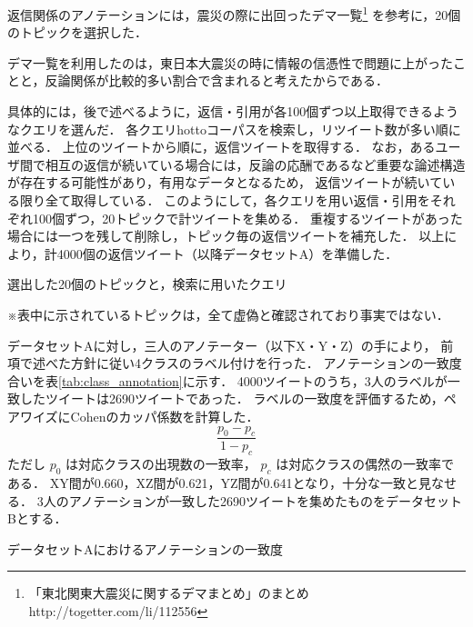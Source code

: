 \documentclass[japanese]{jnlp_1.4}
\newcommand{\addspan}[1]{}
\begin{document}
返信関係のアノテーションには，震災の際に出回ったデマ一覧\footnote{「東北関東大震災に関するデマまとめ」のまとめ http://togetter.com/li/112556}
を参考に，20個のトピックを選択した．
\addspan{トピックは，デマの内容を端的に説明する短い文である．}
デマ一覧を利用したのは，東日本大震災の時に情報の信憑性で問題に上がったことと，反論関係が比較的多い割合で含まれると考えたからである．
\addspan{それぞれのトピックに関連するツイートを収集するために，クエリとしてトピック中の単語を設定する．}
\addspan{選んだトピックとクエリを表\ref{tab:20query}に示す．}
\addspan{これらのトピックは，クエリで検索できるツイートから，十分な数の返信を抽出できるように選択した．}
具体的には，後で述べるように，返信・引用が各100個ずつ以上取得できるような\addspan{トピックと}クエリを選んだ．
各クエリ\addspan{で}hottoコーパスを検索し，リツイート数が多い順に並べる．
上位のツイートから順に，返信ツイートを取得する．
なお，あるユーザ間で相互の返信が続いている場合には，反論の応酬であるなど重要な論述構造が存在する可能性があり，有用なデータとなるため，
返信ツイートが続いている限り全て取得している．
このようにして，各クエリを用い返信・引用をそれぞれ100個ずつ，20トピックで計\addspan{4000}ツイートを集める．
\addspan{この中に}重複するツイートがあった場合には一つを残して削除し，トピック毎の返信ツイートを補充した．
以上により，計4000個の返信ツイート（以降データセットA）を準備した．

\begin{table}[t]
\caption{選出した20個のトピックと，検索に用いたクエリ}
\label{tab:20query}

\vspace{0.5zw}\small
  ※表中に示されているトピックは，全て虚偽と確認されており事実ではない．\par
\end{table}

データセットAに対し，三人のアノテーター（以下X・Y・Z）の手により，
前項で述べた方針に従い4クラスのラベル付けを行った．
アノテーションの一致度合いを表\ref{tab:class_annotation}に示す．
4000ツイートのうち，3人のラベルが一致したツイートは2690ツイートであった．
ラベルの一致度を評価するため，ペアワイズにCohenのカッパ係数を計算した．
\[
\frac{p_0 - p_c}{1 - p_c}
\]
ただし $p_0$ は対応クラスの出現数の一致率， $p_c$ は対応クラスの偶然の一致率である．
XY間が0.660，XZ間が0.621，YZ間が0.641となり，十分な一致と見なせる．
3人のアノテーションが一致した2690ツイートを集めたものをデータセットBとする．

\begin{table}[t]
\caption{データセットAにおけるアノテーションの一致度}
\label{tab:class_annotation}

\end{table}
\end{document}
